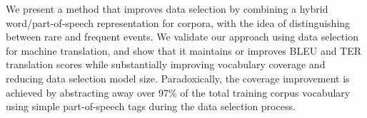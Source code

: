 We present a method that improves data selection by combining a hybrid word/part-of-speech representation for corpora, with the idea of distinguishing between rare and frequent events. We validate our approach using data selection for machine translation, and show that it maintains or improves BLEU and TER translation scores while substantially improving vocabulary coverage and reducing data selection model size. Paradoxically, the coverage improvement is achieved by abstracting away over 97\% of the total training corpus vocabulary using simple part-of-speech tags during the data selection process.

